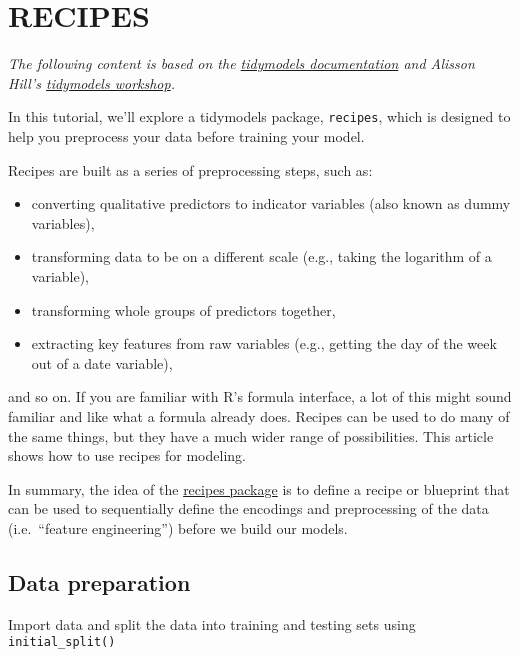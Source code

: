 \documentclass[
]{book}
\providecommand{\tightlist}{%
  \setlength{\itemsep}{0pt}\setlength{\parskip}{0pt}}
\begin{document}
\hypertarget{part-recipes}{%
\part{RECIPES}\label{part-recipes}}

\emph{The following content is based on the \href{https://www.tidymodels.org/start/recipes/}{tidymodels documentation} and Alisson Hill's \href{https://alison.rbind.io/tags/tidymodels/}{tidymodels workshop}.}

In this tutorial, we'll explore a tidymodels package, \texttt{recipes}, which is designed to help you preprocess your data before training your model.

Recipes are built as a series of preprocessing steps, such as:

\begin{itemize}
\tightlist
\item
  converting qualitative predictors to indicator variables (also known as dummy variables),
\item
  transforming data to be on a different scale (e.g., taking the logarithm of a variable),
\item
  transforming whole groups of predictors together,
\item
  extracting key features from raw variables (e.g., getting the day of the week out of a date variable),
\end{itemize}

and so on. If you are familiar with R's formula interface, a lot of this might sound familiar and like what a formula already does. Recipes can be used to do many of the same things, but they have a much wider range of possibilities. This article shows how to use recipes for modeling.

In summary, the idea of the \href{https://recipes.tidymodels.org}{recipes package} is to define a recipe or blueprint that can be used to sequentially define the encodings and preprocessing of the data (i.e.~``feature engineering'') before we build our models.

\hypertarget{data-preparation}{%
\chapter{Data preparation}\label{data-preparation}}

Import data and split the data into training and testing sets using \texttt{initial\_split()}
\end{document}
